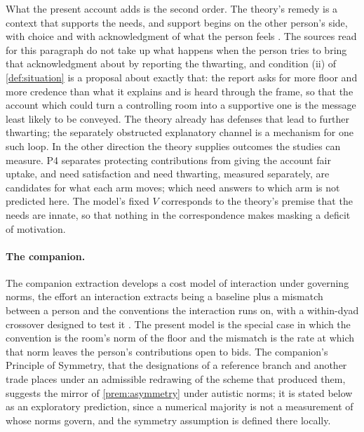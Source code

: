 What the present account adds is the second order. The theory's remedy is a context that supports the needs, and support begins on the other person's side, with choice and with acknowledgment of what the person feels \cite{RyanDeci2022}. The sources read for this paragraph do not take up what happens when the person tries to bring that acknowledgment about by reporting the thwarting, and condition (ii) of \autoref{def:situation} is a proposal about exactly that: the report asks for more floor and more credence than what it explains and is heard through the frame, so that the account which could turn a controlling room into a supportive one is the message least likely to be conveyed. The theory already has defenses that lead to further thwarting; the separately obstructed explanatory channel is a mechanism for one such loop. In the other direction the theory supplies outcomes the studies can measure. P4 separates protecting contributions from giving the account fair uptake, and need satisfaction and need thwarting, measured separately, are candidates for what each arm moves; which need answers to which arm is not predicted here. The model's fixed $V$ corresponds to the theory's premise that the needs are innate, so that nothing in the correspondence makes masking a deficit of motivation.

\paragraph{The companion.} The companion extraction develops a cost model of interaction under governing norms, the effort an interaction extracts being a baseline plus a mismatch between a person and the conventions the interaction runs on, with a within-dyad crossover designed to test it \cite{NormCost}. The present model is the special case in which the convention is the room's norm of the floor and the mismatch is the rate at which that norm leaves the person's contributions open to bids. The companion's Principle of Symmetry, that the designations of a reference branch and another trade places under an admissible redrawing of the scheme that produced them, suggests the mirror of \autoref{prem:asymmetry} under autistic norms; it is stated below as an exploratory prediction, since a numerical majority is not a measurement of whose norms govern, and the symmetry assumption is defined there locally.

